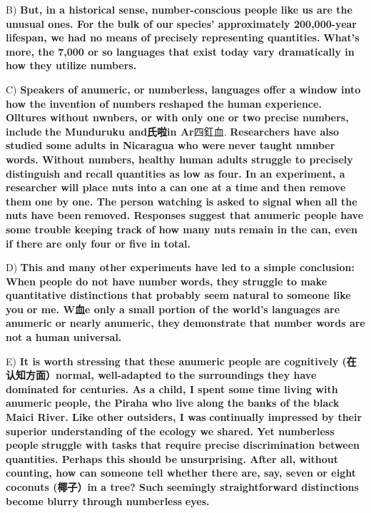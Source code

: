 \documentclass[UTF8,11pt]{ctexart}
\begin{document}
B) \textbf{But, in a historical sense, number-conscious people like us are the unusual ones. For the bulk of our} \textbf{species' approximately 200,000-year lifespan, we had no means of precisely representing quantities.} \textbf{What's more, the 7,000 or so languages that exist today vary dramatically in how they utilize numbers.}


C) \textbf{Speakers of anumeric, or numberless, languages offer a window into how the invention of numbers} \textbf{reshaped the human experience. Olltures without nwnbers, or with only one or two precise numbers, include} \textbf{the Munduruku and氏啦in Ar}四釭血.\textbf{ Researchers have also studied some adults in Nicaragua who were} \textbf{never taught nmnber words. Without numbers, healthy human adults struggle to precisely distinguish and} \textbf{recall quantities as low as four. In an experiment, a researcher will place nuts into a can one at a time} \textbf{and then remove them one by one. The person watching is asked to signal when all the nuts have been} \textbf{removed. Responses suggest that anumeric people have some trouble keeping track of how many nuts} \textbf{remain in the can, even if there are only four or five in total.}


D) \textbf{This and many other experiments have led to a simple conclusion: When people do not have number} \textbf{words, they struggle to make quantitative distinctions that probably seem natural to someone like you} \textbf{or me. W血e only a small portion of the world's languages are anumeric or nearly anumeric, they} \textbf{demonstrate that number words are not a human universal.}


E) \textbf{It is worth stressing that these anumeric people are cognitively (在认知方面）normal, well-adapted to} \textbf{the surroundings they have dominated for centuries. As a child, I spent some time living with anumeric} \textbf{people, the Piraha who live along the banks of the black Maici River. Like other outsiders, I was} \textbf{continually impressed by their superior understanding of the ecology we shared. Yet numberless people} \textbf{struggle with tasks that require precise discrimination between quantities. Perhaps this should be} \textbf{unsurprising. After all, without counting, how can someone tell whether there are, say, seven or eight} \textbf{coconuts (椰子）in a tree? Such seemingly straightforward distinctions become blurry through numberless} \textbf{eyes.}
\end{document}
